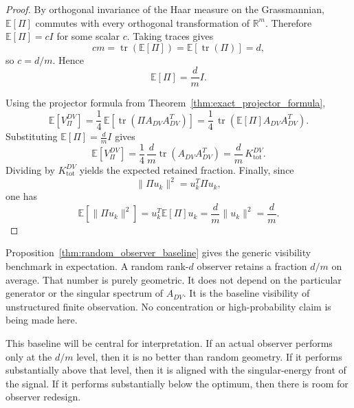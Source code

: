 \documentclass[11pt,a4paper]{article}
\numberwithin{equation}{section}
\theoremstyle{thmcompact}
\theoremstyle{remark}
\begin{document}
\begin{proof}
By orthogonal invariance of the Haar measure on the Grassmannian, \(\mathbb E[\Pi]\) commutes with every orthogonal transformation of \(\mathbb R^m\). Therefore \(\mathbb E[\Pi]=cI\) for some scalar \(c\). Taking traces gives
\begin{equation}
cm=\operatorname{tr}(\mathbb E[\Pi])=\mathbb E[\operatorname{tr}(\Pi)]=d,
\end{equation}
so \(c=d/m\). Hence
\begin{equation}
\mathbb E[\Pi]=\frac{d}{m}I.
\end{equation}

Using the projector formula from Theorem~\ref{thm:exact_projector_formula},
\begin{equation}
\mathbb E[V_\Pi^{DV}]
=
\frac14\,\mathbb E[\operatorname{tr}(\Pi A_{DV}A_{DV}^T)]
=
\frac14\,\operatorname{tr}(\mathbb E[\Pi]A_{DV}A_{DV}^T).
\end{equation}
Substituting \(\mathbb E[\Pi]=\frac{d}{m}I\) gives
\begin{equation}
\mathbb E[V_\Pi^{DV}]
=
\frac14\,\frac{d}{m}\operatorname{tr}(A_{DV}A_{DV}^T)
=
\frac{d}{m}\,K_{\mathrm{tot}}^{DV}.
\end{equation}
Dividing by \(K_{\mathrm{tot}}^{DV}\) yields the expected retained fraction. Finally, since
\begin{equation}
\|\Pi u_k\|^2=u_k^T\Pi u_k,
\end{equation}
one has
\begin{equation}
\mathbb E[\|\Pi u_k\|^2]
=
u_k^T\mathbb E[\Pi]u_k
=
\frac{d}{m}\|u_k\|^2
=
\frac{d}{m}.
\end{equation}
\end{proof}

Proposition~\ref{thm:random_observer_baseline} gives the generic visibility benchmark in expectation. A random rank-\(d\) observer retains a fraction \(d/m\) on average. That number is purely geometric. It does not depend on the particular generator or the singular spectrum of \(A_{DV}\). It is the baseline visibility of unstructured finite observation. No concentration or high-probability claim is being made here.

This baseline will be central for interpretation. If an actual observer performs only at the \(d/m\) level, then it is no better than random geometry. If it performs substantially above that level, then it is aligned with the singular-energy front of the signal. If it performs substantially below the optimum, then there is room for observer redesign.
\end{document}
